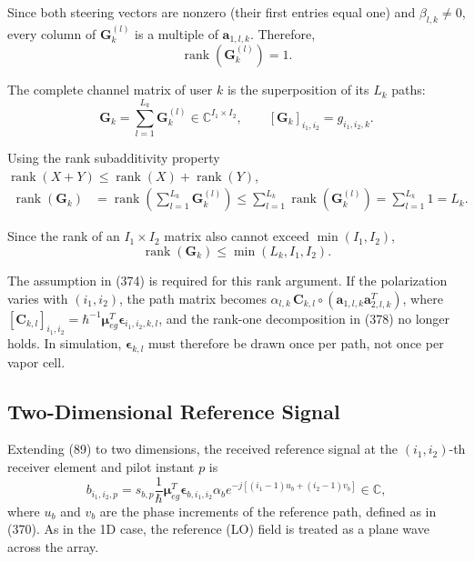 \documentclass[12pt,a4paper]{article}
\begin{document}
Since both steering vectors are nonzero (their first entries equal
one) and $\beta_{l,k}\neq0$, every column of $\mathbf G_k^{(l)}$ is a
multiple of $\mathbf a_{1,l,k}$. Therefore,
\begin{equation}
\operatorname{rank}\!\left(
\mathbf G_k^{(l)}
\right)=1.
\tag{379}
\end{equation}

The complete channel matrix of user $k$ is the superposition of its
$L_k$ paths:
\begin{equation}
\boxed{
\mathbf G_k
 =
 \sum_{l=1}^{L_k}\mathbf G_k^{(l)}
 \in\mathbb C^{I_1\times I_2},
 \qquad
 [\mathbf G_k]_{i_1,i_2}=g_{i_1,i_2,k}.
}
\tag{380}
\end{equation}

Using the rank subadditivity property
$\operatorname{rank}(X+Y)\leq\operatorname{rank}(X)+\operatorname{rank}(Y)$,
\begin{equation}
\begin{aligned}
\operatorname{rank}(\mathbf G_k)
&=
\operatorname{rank}\!\left(
\sum_{l=1}^{L_k}\mathbf G_k^{(l)}
\right)
\leq
\sum_{l=1}^{L_k}
\operatorname{rank}\!\left(\mathbf G_k^{(l)}\right)
=
\sum_{l=1}^{L_k}1
=L_k.
\end{aligned}
\tag{381}
\end{equation}

Since the rank of an $I_1\times I_2$ matrix also cannot exceed
$\min(I_1,I_2)$,
\begin{equation}
\boxed{
\operatorname{rank}(\mathbf G_k)\leq \min(L_k,I_1,I_2).
}
\tag{382}
\end{equation}

The assumption in (374) is required for this rank argument. If the
polarization varies with $(i_1,i_2)$, the path matrix becomes
$\alpha_{l,k}\,\mathbf C_{k,l}\circ(\mathbf a_{1,l,k}\mathbf a_{2,l,k}^{T})$,
where $[\mathbf C_{k,l}]_{i_1,i_2}=\hbar^{-1}\boldsymbol\mu_{eg}^{T}
\boldsymbol\epsilon_{i_1,i_2,k,l}$, and the rank-one decomposition in
(378) no longer holds. In simulation, $\boldsymbol\epsilon_{k,l}$ must
therefore be drawn once per path, not once per vapor cell.

\subsection{Two-Dimensional Reference Signal}

Extending (89) to two dimensions, the received reference signal at the
$(i_1,i_2)$-th receiver element and pilot instant $p$ is
\begin{equation}
\boxed{
 b_{i_1,i_2,p}
 =
 s_{b,p}
 \frac{1}{\hbar}
 \boldsymbol{\mu}_{eg}^{T}\boldsymbol{\epsilon}_{b,i_1,i_2}
 \alpha_b
 e^{-j[(i_1-1)u_b+(i_2-1)v_b]}
 \in\mathbb C,
}
\tag{383}
\end{equation}
where $u_b$ and $v_b$ are the phase increments of the reference path,
defined as in (370). As in the 1D case, the reference (LO) field is
treated as a plane wave across the array.
\end{document}
